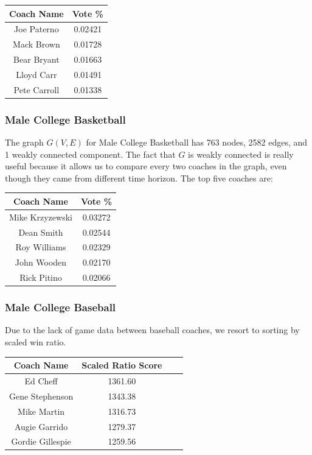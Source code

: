\documentclass[11pt,notitlepage]{article}
\begin{document}
\begin{center}
\begin{tabular}{ | c | c | }
\hline
Coach Name   & Vote \% \\\hline
Joe Paterno  & 0.02421 \\\hline
Mack Brown   & 0.01728 \\\hline
Bear Bryant  & 0.01663 \\\hline
Lloyd Carr   & 0.01491 \\\hline
Pete Carroll & 0.01338 \\
\hline
\end{tabular}
\end{center}

\subsubsection*{Male College Basketball}

\noindent The graph $G(V, E)$ for Male College Basketball has 763 nodes, 2582 edges, and 1 weakly connected component. The fact that $G$ is weakly connected is really useful because it allows us to compare every two coaches in the graph, even though they came from different time horizon. The top five coaches are:

\begin{center}
\begin{tabular}{ | c | c | }
\hline
Coach Name  & Vote \% \\\hline
Mike Krzyzewski & 0.03272 \\\hline
Dean Smith  & 0.02544 \\\hline
Roy Williams & 0.02329 \\\hline
John Wooden  & 0.02170 \\\hline
Rick Pitino  & 0.02066 \\
\hline
\end{tabular}
\end{center}

\subsubsection*{Male College Baseball}

Due to the lack of game data between baseball coaches, we resort to sorting by scaled win ratio.

\begin{center}
\begin{tabular}{ | c | c | c| c | }
\hline
Coach Name       & Scaled Ratio Score \\\hline
Ed Cheff         & 1361.60 \\\hline
Gene Stephenson  & 1343.38 \\\hline
Mike Martin      & 1316.73 \\\hline
Augie Garrido    & 1279.37 \\\hline
Gordie Gillespie & 1259.56 \\
\hline
\end{tabular}
\end{center}
\end{document}
